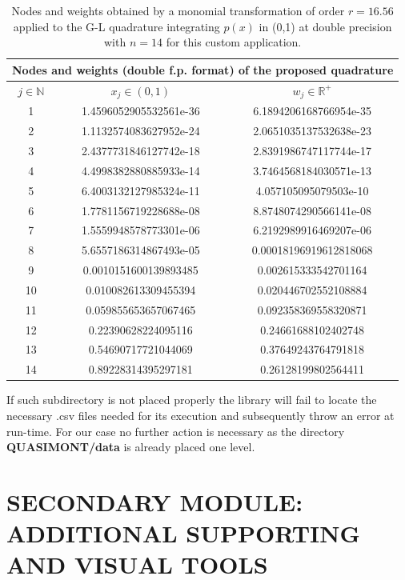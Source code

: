 \documentclass[a4paper, twosided]{book}
\begin{document}
\begin{table}[H]
\centering
\begin{tabular}{|c||c|c|}
\hline
\multicolumn{3}{|c|}{\textbf{Nodes and weights (double f.p. format) of the proposed quadrature}} \\
\hline
$j\in\mathbb{N}$ & $x_j\in(0,1)$ & $w_j\in\mathbb{R}^+$ \\
\hline
1   &  1.4596052905532561e-36   &  6.1894206168766954e-35 \\
2   &  1.1132574083627952e-24   &  2.0651035137532638e-23 \\
3   &  2.4377731846127742e-18   &  2.8391986747117744e-17 \\ 
4   &  4.4998382880885933e-14   &  3.7464568184030571e-13 \\
5   &  6.4003132127985324e-11   &  4.057105095079503e-10  \\
6   &  1.7781156719228688e-08   &  8.8748074290566141e-08 \\
7   &  1.5559948578773301e-06   &  6.2192989916469207e-06 \\
8   &  5.6557186314867493e-05   &  0.00018196919612818068 \\
9   &  0.0010151600139893485    &  0.002615333542701164   \\
10   &  0.010082613309455394     &  0.020446702552108884   \\
11  &  0.059855653657067465     &  0.092358369558320871   \\
12  &  0.22390628224095116      &  0.24661688102402748    \\
13  &  0.54690717721044069      &  0.37649243764791818    \\
14  &  0.89228314395297181      &  0.26128199802564411    \\
\hline
\end{tabular}
  \caption{Nodes and weights obtained by a monomial transformation of order $r=16.56$ applied to the G-L quadrature integrating $p(x)$ in (0,1) at double precision with $n=14$ for this custom application.}
  \label{table3.1}
\end{table}

\noindent
If such subdirectory is not placed properly the library will fail to locate the necessary \colorbox{poliGrayBlue}{.csv} files needed for its execution and subsequently throw an error at run-time. For our case no further action is necessary as the directory \colorbox{poliGrayBlue}{\textbf{QUASIMONT/data}} is already placed one level.

\section[Additional supporting and visual tools]{\changefont SECONDARY MODULE:  ADDITIONAL SUPPORTING AND VISUAL TOOLS}\label{Sec3.4}
\end{document}
